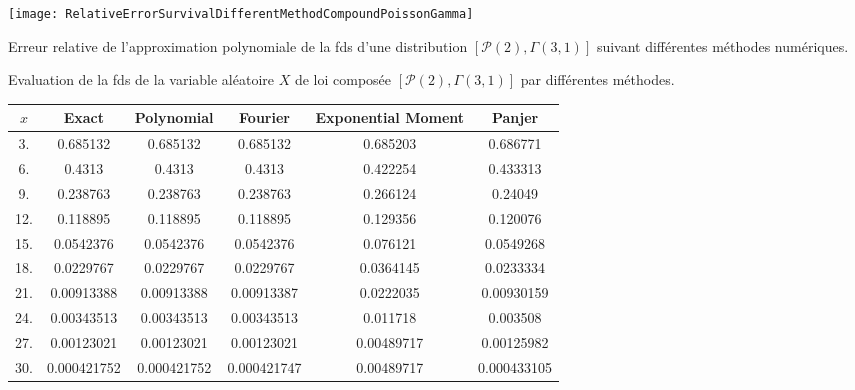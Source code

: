 \begin{figureth}			
\texttt{[image: RelativeErrorSurvivalDifferentMethodCompoundPoissonGamma]}
\caption{Erreur relative de l\rq{}approximation polynomiale de la \gls{fds} d'une distribution $\left[\mathcal{P}(2),\Gamma(3,1)\right]$ suivant différentes méthodes numériques.}		
\label{RelativeErrorSurvivalDifferentMethodCompoundPoissonGamma}
	\end{figureth}
\begin{tableth}
		\caption[Approximations de la \gls{fds} d'une loi $\left(\mathcal{P}(2),\Gamma(3,1)\right)$ via différentes méthodes]{Evaluation de la \gls{fds} de la variable aléatoire $X$ de loi composée $\left[\mathcal{P}(2),\Gamma(3,1)\right]$ par différentes méthodes.}
			\label{TableSurvivalPolynomialCompoundPoissonGammaDifferentMethod}
		\begin{tabular}{|c||c|c|c|c|c|}
\hline
$x$ &Exact& Polynomial&Fourier  & Exponential Moment &Panjer \\
\hline
\hline
3. & 0.685132 & 0.685132 & 0.685132 & 0.685203 & 0.686771 \\
 6. & 0.4313 & 0.4313 & 0.4313 & 0.422254 & 0.433313 \\
 9. & 0.238763 & 0.238763 & 0.238763 & 0.266124 & 0.24049 \\
 12. & 0.118895 & 0.118895 & 0.118895 & 0.129356 & 0.120076 \\
 15. & 0.0542376 & 0.0542376 & 0.0542376 & 0.076121 & 0.0549268 \\
 18. & 0.0229767 & 0.0229767 & 0.0229767 & 0.0364145 & 0.0233334 \\
 21. & 0.00913388 & 0.00913388 & 0.00913387 & 0.0222035 & 0.00930159 \\
 24. & 0.00343513 & 0.00343513 & 0.00343513 & 0.011718 & 0.003508 \\
 27. & 0.00123021 & 0.00123021 & 0.00123021 & 0.00489717 & 0.00125982 \\
 30. & 0.000421752 & 0.000421752 & 0.000421747 & 0.00489717 & 0.000433105 \\
\hline
		\end{tabular}
	\end{tableth}

